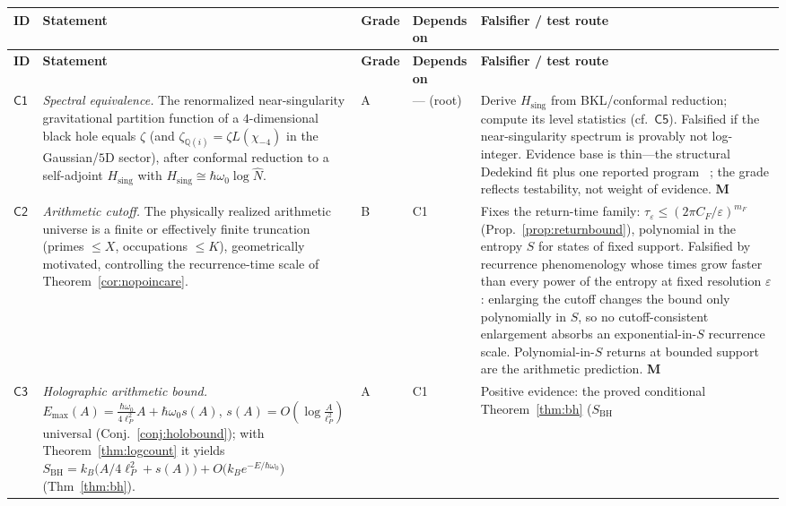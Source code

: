 \documentclass[11pt,a4paper]{article}
\theoremstyle{plain}
\theoremstyle{definition}
\theoremstyle{remark}
\newcommand{\Qq}{\mathbb{Q}}
\newcommand{\Nhat}{\widehat{N}}
\begin{document}
\begin{longtable}{@{}p{}p{}p{}p{}p{}@{}}
\toprule
\textbf{ID} & \textbf{Statement} & \textbf{Grade} & \textbf{Depends on} & \textbf{Falsifier / test route}\\
\midrule
\endfirsthead
\toprule
\textbf{ID} & \textbf{Statement} & \textbf{Grade} & \textbf{Depends on} & \textbf{Falsifier / test route}\\
\midrule
\endhead
\bottomrule
\endfoot
$\mathsf{C1}$ &
\emph{Spectral equivalence.} The renormalized near-singularity gravitational partition
function of a $4$-dimensional black hole equals $\zeta$ (and $\zeta_{\Qq(i)}=\zeta
L(\chi_{-4})$ in the Gaussian/$5$D sector), after conformal reduction to a self-adjoint
$H_{\mathrm{sing}}$ with $H_{\mathrm{sing}}\cong\hbar\omega_{0}\log\Nhat$. &
A &
--- (root) &
Derive $H_{\mathrm{sing}}$ from BKL/conformal reduction; compute its level statistics
(cf.\ $\mathsf{C5}$). Falsified if the near-singularity spectrum is provably not
log-integer. Evidence base is thin---the structural Dedekind fit plus one reported program
~\cite{hartnollyang2026}; the grade reflects testability, not weight of evidence. \textbf{M}\\
$\mathsf{C2}$ &
\emph{Arithmetic cutoff.} The physically realized arithmetic universe is a finite or
effectively finite truncation (primes $\leq X$, occupations $\leq K$), geometrically
motivated, controlling the recurrence-time scale of Theorem~\ref{cor:nopoincare}. &
B &
C1 &
Fixes the return-time family: $\tau_{\varepsilon}\leq(2\pi C_{F}/\varepsilon)^{m_{F}}$
(Prop.~\ref{prop:returnbound}), polynomial in the entropy $S$ for states of fixed support.
Falsified by recurrence phenomenology whose times grow faster than every power of the
entropy at fixed resolution $\varepsilon$: enlarging the cutoff changes the bound only
polynomially in $S$, so no cutoff-consistent enlargement absorbs an exponential-in-$S$
recurrence scale. Polynomial-in-$S$ returns at bounded support are the arithmetic
prediction. \textbf{M}\\
$\mathsf{C3}$ &
\emph{Holographic arithmetic bound.} $E_{\max}(A)=\frac{\hbar\omega_{0}}{4\ell_{P}^{2}}A+\hbar\omega_{0}s(A)$,
$s(A)=O(\log\frac{A}{\ell_{P}^{2}})$ universal (Conj.~\ref{conj:holobound}); with
Theorem~\ref{thm:logcount} it yields
$S_{\mathrm{BH}}=k_{B}\bigl(A/4\ell_{P}^{2}+s(A)\bigr)+O\bigl(k_{B}e^{-E/\hbar\omega_{0}}\bigr)$ (Thm~\ref{thm:bh}). &
A &
C1 &
Positive evidence: the proved conditional Theorem~\ref{thm:bh} ($S_{\mathrm{BH}}$

\end{longtable}
\end{document}

